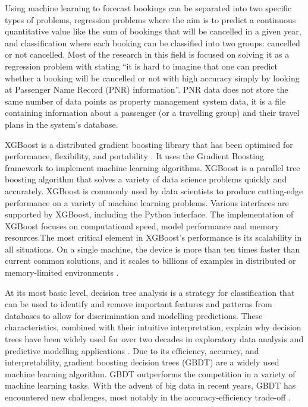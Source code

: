 \vspace{5mm}

Using machine learning to forecast bookings can be separated into two specific types of problems, regression problems where the aim is to predict a continuous quantitative value like the sum of bookings that will be cancelled in a given year, and classification where each booking can be classified into two groups: cancelled or not cancelled. Most of the research in this field is focused on solving it as a regression problem with  \cite{RomeroMorales2010ForecastingMining} stating “it is hard to imagine that one can predict whether a booking will be cancelled or not with high accuracy simply by looking at Passenger Name Record (PNR) information”. PNR data does not store the same number of data points as property management system data, it is a file containing information about a passenger (or a travelling group) and their travel plans in the system's database.

\vspace{5mm}

XGBoost is a distributed gradient boosting library that has been optimised for performance, flexibility, and portability \cite{Chen2016XGBoost:System}. It uses the Gradient Boosting framework to implement machine learning algorithms. XGBoost is a parallel tree boosting algorithm that solves a variety of data science problems quickly and accurately. XGBoost is commonly used by data scientists to produce cutting-edge performance on a variety of machine learning problems. Various interfaces are supported by XGBoost, including the Python interface. The implementation of XGBoost focuses on computational speed, model performance and memory resources.The most critical element in XGBoost's performance is its scalability in all situations. On a single machine, the device is more than ten times faster than current common solutions, and it scales to billions of examples in distributed or memory-limited environments \cite{ChenXGBoost:System}.

\vspace{5mm}

At its most basic level, decision tree analysis is a strategy for classification that can be used to identify and remove important features and patterns from databases to allow for discrimination and modelling predictions. These characteristics, combined with their intuitive interpretation, explain why decision trees have been widely used for over two decades in exploratory data analysis and predictive modelling applications \cite{Myles2004AnModeling}. Due to its efficiency, accuracy, and interpretability, gradient boosting decision trees (GBDT) are a widely used machine learning algorithm. GBDT outperforms the competition in a variety of machine learning tasks. With the advent of big data in recent years, GBDT has encountered new challenges, most notably in the accuracy-efficiency trade-off \cite{KeLightGBM:Tree}.


